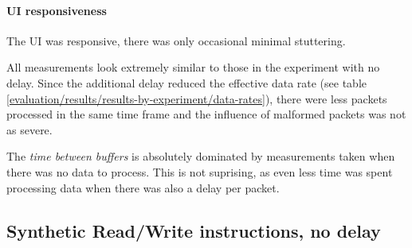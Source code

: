 \paragraph{UI responsiveness}

The UI was responsive, there was only occasional minimal stuttering.
\bigbreak

All measurements look extremely similar to those in the experiment with no delay. Since the additional
delay reduced the effective data rate (see table \ref{evaluation/results/results-by-experiment/data-rates}),
there were less packets processed in the same time frame and the influence of malformed packets was
not as severe.

The \textit{time between buffers} is absolutely dominated by measurements taken when there was no
data to process. This is not suprising, as even less time was spent processing data when there was
also a delay per packet.

\clearpage
\subsection{Synthetic Read/Write instructions, no delay}
\label{evaluation/results/synthetic-read-write-instructions-no-delay}

